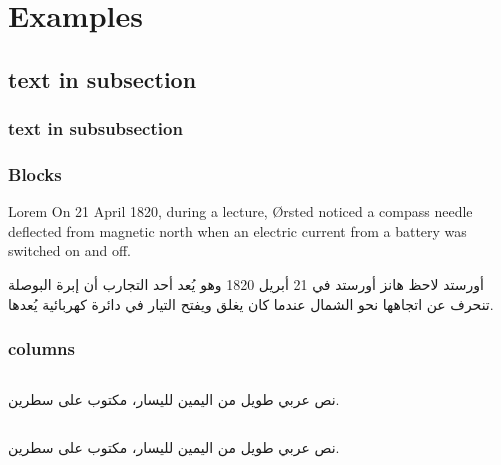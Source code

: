 \documentclass[hyperref=unicode]{beamer}
\begin{document}
\section{Examples}

\subsection{text in subsection}
\subsubsection{text in subsubsection}

\begin{frame}
\frametitle{Blocks}


\begin{block}{Lorem}
  \foreignlanguage*{nil}{On 21 April 1820, during a lecture, Ørsted
  noticed a compass\cite{Dijkstra1982} needle deflected from magnetic north when an
  electric current from a battery was switched on and off.}
\end{block}


\begin{block}{أورستد}
  لاحظ هانز أورستد في 21 أبريل 1820 وهو يُعد أحد التجارب أن إبرة
  البوصلة تنحرف عن اتجاهها نحو الشمال عندما كان يغلق ويفتح التيار في
  دائرة كهربائية يُعدها.
\end{block}
\end{frame}

\begin{frame}
\frametitle{columns}
\begin{columns}[t]
\begin{column}{5cm}
نص عربي طويل من اليمين لليسار، مكتوب على سطرين.
\end{column}
\begin{column}{5cm}
\end{column}
\end{columns}

\bigskip

\begin{columns}[b]
\begin{column}{5cm}
نص عربي طويل من اليمين لليسار، مكتوب على سطرين.
\end{column}
\begin{column}{5cm}
\end{column}
\end{columns}
\end{frame}
\end{document}
